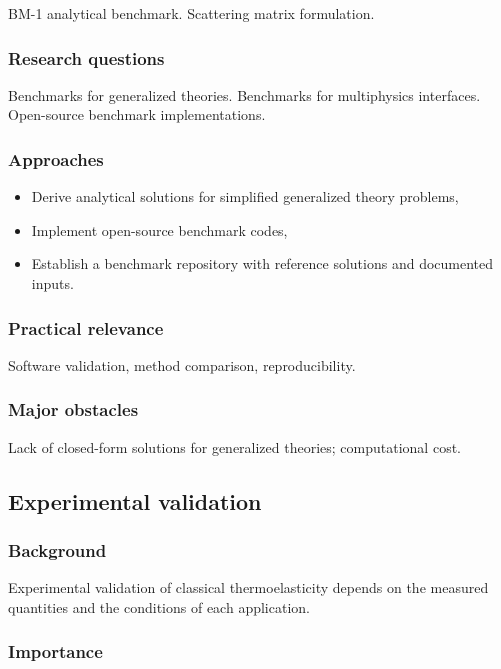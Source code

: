 BM-1 analytical benchmark. Scattering matrix formulation.

\subsubsection{Research questions}

Benchmarks for generalized theories. Benchmarks for multiphysics interfaces. Open-source benchmark implementations.

\subsubsection{Approaches}

\begin{itemize}
\item Derive analytical solutions for simplified generalized theory problems,
\item Implement open-source benchmark codes,
\item Establish a benchmark repository with reference solutions and documented inputs.
\end{itemize}

\subsubsection{Practical relevance}

Software validation, method comparison, reproducibility.

\subsubsection{Major obstacles}

Lack of closed-form solutions for generalized theories; computational cost.

\subsection{Experimental validation}
\label{sec:experimental-validation}

\subsubsection{Background}

Experimental validation of classical thermoelasticity depends on the measured quantities and the conditions of each application.

\subsubsection{Importance}

